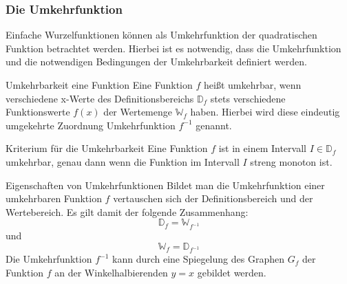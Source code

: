   \subsubsection{Die Umkehrfunktion}
  Einfache Wurzelfunktionen können als Umkehrfunktion der quadratischen Funktion betrachtet werden. Hierbei ist es notwendig, dass die Umkehrfunktion und die notwendigen Bedingungen der Umkehrbarkeit definiert werden. 
  \begin{defi}{Umkehrbarkeit eine Funktion}{}
Eine Funktion $f$ heißt umkehrbar, wenn verschiedene x-Werte des Definitionsbereichs $\mathds{D}_f$ stets verschiedene Funktionswerte $f(x)$ der Wertemenge $ \mathds{W}_f$ haben. Hierbei wird diese eindeutig umgekehrte Zuordnung Umkehrfunktion $f^{-1}$ genannt.
  \end{defi}
\begin{merke}{Kriterium für die Umkehrbarkeit}{}
Eine Funktion $f$ ist in einem Intervall $I\in \mathds{D}_f$ umkehrbar, genau dann wenn die Funktion im Intervall $I$ streng monoton ist. 
\end{merke}
\begin{b8d}{Eigenschaften von Umkehrfunktionen}{}
Bildet man die Umkehrfunktion einer umkehrbaren Funktion $f$ vertauschen sich der Definitionsbereich und der Wertebereich. Es gilt damit der folgende Zusammenhang: $$\mathds{D}_f = \mathds{W}_{f^{-1}}$$ und $$\mathds{W}_{f} = \mathds{D}_{f^{-1}}$$
Die Umkehrfunktion $f^{-1}$ kann durch eine Spiegelung des Graphen $G_f$ der Funktion $f$ an der Winkelhalbierenden $y= x$ gebildet werden.
\end{b8d}
